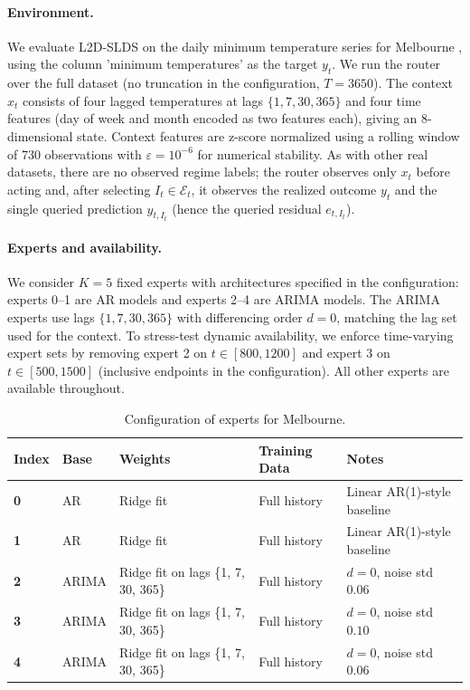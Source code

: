 \paragraph{Environment.}
We evaluate L2D-SLDS on the daily minimum temperature series for Melbourne \citep{daily_min_temp_melbourne_kaggle}, using the column 'minimum temperatures' as the target \(y_t\). We run the router over the
full dataset (no truncation in the configuration, $T=3650$). The context \(x_t\) consists of four lagged temperatures at
lags \(\{1, 7, 30, 365\}\) and four time features (day of week and month encoded as two features each), giving an
8-dimensional state. Context features are z-score normalized using a rolling window of 730 observations with
\(\varepsilon=10^{-6}\) for numerical stability. As with other real datasets, there are no observed regime labels;
the router observes only \(x_t\) before acting and, after selecting \(I_t\in\mathcal{E}_t\), it observes the realized
outcome \(y_t\) and the single queried prediction \(\hat y_{t,I_t}\) (hence the queried residual \(e_{t,I_t}\)).

\paragraph{Experts and availability.}
We consider \(K=5\) fixed experts with architectures specified in the configuration:
experts 0--1 are AR models and experts 2--4 are ARIMA models.
The ARIMA experts use lags \(\{1, 7, 30, 365\}\) with differencing order \(d=0\), matching the lag set used for the
context. To stress-test dynamic availability, we enforce time-varying expert sets by removing expert 2 on
\(t\in[800,1200]\) and expert 3 on \(t\in[500,1500]\) (inclusive endpoints in the configuration). All other experts are
available throughout.

\begin{table}[H]
\centering
\small
\setlength{\tabcolsep}{4pt}
\caption{Configuration of experts for Melbourne.}
\label{tab:experts_melbourne_appendix}
\begin{tabular}{@{}lllll@{}}
\toprule
Index & Base & Weights & Training Data & Notes \\
\midrule
\textbf{0} & AR & Ridge fit  & Full history & Linear AR(1)-style baseline \\
\textbf{1} & AR & Ridge fit  & Full history & Linear AR(1)-style baseline \\
\textbf{2} & ARIMA & Ridge fit on lags \{1, 7, 30, 365\} & Full history & $d=0$, noise std $0.06$ \\
\textbf{3} & ARIMA & Ridge fit on lags \{1, 7, 30, 365\} & Full history & $d=0$, noise std $0.10$ \\
\textbf{4} & ARIMA & Ridge fit on lags \{1, 7, 30, 365\} & Full history & $d=0$, noise std $0.06$ \\
\bottomrule
\end{tabular}
\end{table}

